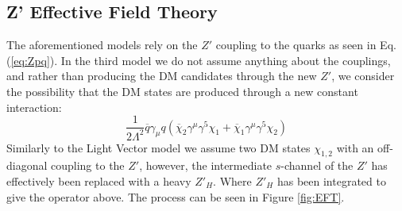 \documentclass[12pt, a4paper]{book}
\begin{document}
\subsection{Z' Effective Field Theory}
The aforementioned models rely on the $Z'$ coupling to the quarks as seen in Eq. (\ref{eq:Zpq}). In the third model we do not assume anything about the couplings, and rather than producing the DM candidates through the new $Z'$, 
we consider the possibility that the DM states are produced through a new constant interaction: 
\begin{equation}
    \frac{1}{2\Lambda^2}\overline{q}\gamma_\mu q(\overline{\chi}_2\gamma^\mu\gamma^5\chi_1 + \overline{\chi}_1\gamma^\mu\gamma^5\chi_2)
\end{equation}
Similarly to the Light Vector model we assume two DM states $\chi_{1,2}$ with an off-diagonal coupling to the $Z'$, however, the intermediate $s$-channel of the $Z'$ has effectively been replaced with a heavy $Z'_H$. Where $Z'_H$ 
has been integrated to give the operator above. The process can be seen in Figure \ref{fig:EFT}.
\end{document}
